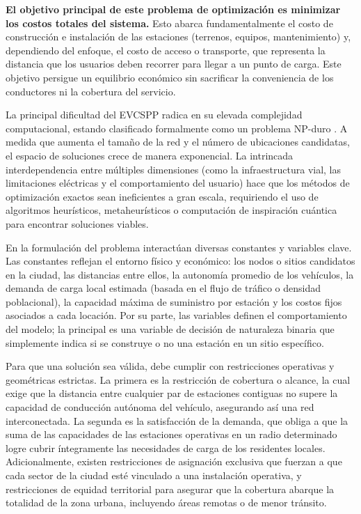 \documentclass[letter, 10pt]{article}
\begin{document}
\textbf{El objetivo principal de este problema de optimizaci\'on es minimizar los costos totales del sistema.} Esto abarca fundamentalmente el costo de construcci\'on e instalaci\'on de las estaciones (terrenos, equipos, mantenimiento) y, dependiendo del enfoque, el costo de acceso o transporte, que representa la distancia que los usuarios deben recorrer para llegar a un punto de carga. Este objetivo persigue un equilibrio econ\'omico sin sacrificar la conveniencia de los conductores ni la cobertura del servicio.


La principal dificultad del EVCSPP radica en su elevada complejidad computacional, estando clasificado formalmente como un problema NP-duro \cite{1_Solving_optimal_evcsp_problem_QUANTUM}\cite{2_EVCSP_2013-ieee-conference}.
A medida que aumenta el tama\~no de la red y el n\'umero de ubicaciones candidatas, el espacio de soluciones crece de manera exponencial. La intrincada interdependencia entre m\'ultiples dimensiones (como la infraestructura vial, las limitaciones el\'ectricas y el comportamiento del usuario) hace que los m\'etodos de optimizaci\'on exactos sean ineficientes a gran escala, requiriendo el uso de algoritmos heur\'isticos, metaheur\'isticos o computaci\'on de inspiraci\'on cu\'antica para encontrar soluciones viables.

En la formulaci\'on del problema interact\'uan diversas constantes y variables clave. Las constantes reflejan el entorno f\'isico y econ\'omico: los nodos o sitios candidatos en la ciudad, las distancias entre ellos, la autonom\'ia promedio de los veh\'iculos, la demanda de carga local estimada (basada en el flujo de tr\'afico o densidad poblacional), la capacidad m\'axima de suministro por estaci\'on y los costos fijos asociados a cada locaci\'on. Por su parte, las variables definen el comportamiento del modelo; la principal es una variable de decisi\'on de naturaleza binaria que simplemente indica si se construye o no una estaci\'on en un sitio espec\'ifico\cite{1_Solving_optimal_evcsp_problem_QUANTUM}.

Para que una soluci\'on sea v\'alida, debe cumplir con restricciones operativas y geom\'etricas estrictas. La primera es la restricci\'on de cobertura o alcance, la cual exige que la distancia entre cualquier par de estaciones contiguas no supere la capacidad de conducci\'on aut\'onoma del veh\'iculo, asegurando as\'i una red interconectada. La segunda es la satisfacci\'on de la demanda, que obliga a que la suma de las capacidades de las estaciones operativas en un radio determinado logre cubrir \'integramente las necesidades de carga de los residentes locales\cite{1_Solving_optimal_evcsp_problem_QUANTUM}. Adicionalmente, existen restricciones de asignaci\'on exclusiva que fuerzan a que cada sector de la ciudad est\'e vinculado a una instalaci\'on operativa, y restricciones de equidad territorial para asegurar que la cobertura abarque la totalidad de la zona urbana, incluyendo \'areas remotas o de menor tr\'ansito\cite{1_Solving_optimal_evcsp_problem_QUANTUM}.
\end{document}
